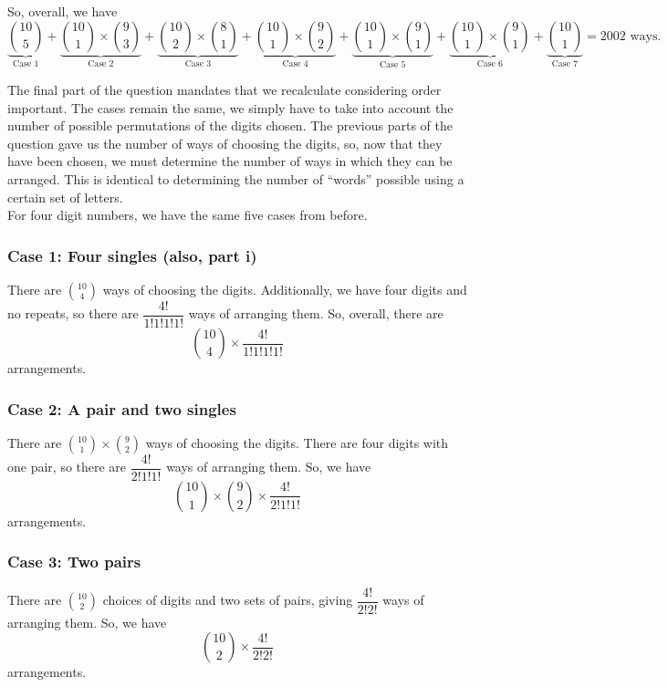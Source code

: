 \documentclass[a4paper,11pt]{article}
\begin{document}
\noindent So, overall, we have
$$
\underbrace{\binom{10}{5}}_\text{Case 1} + \underbrace{\binom{10}{1}\times\binom{9}{3}}_\text{Case 2} + \underbrace{\binom{10}{2}\times\binom{8}{1}}_\text{Case 3} + \underbrace{\binom{10}{1}\times\binom{9}{2}}_\text{Case 4} + \underbrace{\binom{10}{1}\times\binom{9}{1}}_\text{Case 5} + \underbrace{\binom{10}{1}\times\binom{9}{1}}_\text{Case 6} + \underbrace{\binom{10}{1}}_\text{Case 7} = 2002\text{ ways.}
$$

\vspace{1cm}

\noindent The final part of the question mandates that we recalculate considering order important. The cases remain the same, we simply have to take into account the number of possible permutations of the digits chosen. The previous parts of the question gave us the number of ways of choosing the digits, so, now that they have been chosen, we must determine the number of ways in which they can be arranged. This is identical to determining the number of ``words'' possible using a certain set of letters.\\

\noindent For four digit numbers, we have the same five cases from before.
\subsubsection*{Case 1: Four singles (also, part i)}
There are $\binom{10}{4}$ ways of choosing the digits. Additionally, we have four digits and no repeats, so there are $\dfrac{4!}{1!1!1!1!}$ ways of arranging them. So, overall, there are
$$
\binom{10}{4}\times\frac{4!}{1!1!1!1!}
$$
arrangements.

\subsubsection*{Case 2: A pair and two singles}
There are $\binom{10}{1}\times\binom{9}{2}$ ways of choosing the digits. There are four digits with one pair, so there are
$\dfrac{4!}{2!1!1!}$ ways of arranging them. So, we have
$$
\binom{10}{1}\times\binom{9}{2}\times\dfrac{4!}{2!1!1!}
$$
arrangements.

\subsubsection*{Case 3: Two pairs}
There are $\binom{10}{2}$ choices of digits and two sets of pairs, giving $\dfrac{4!}{2!2!}$ ways of arranging them. So, we have
$$
\binom{10}{2}\times\frac{4!}{2!2!}
$$
arrangements.
\end{document}
